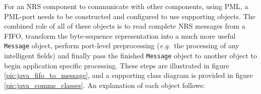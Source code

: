 \documentclass[pdftex,a4paper]{article}
\newif\ifpdf
\newcommand{\eg}{{\em e.g.\ }}
\newcommand{\code}[1]{{\tt \small #1}}
\begin{document}
For an NRS component to communicate with other components, using PML, a
PML-port needs to be constructed and configured to use supporting
objects. The combined role of all of these objects is to read complete
NRS messages from a FIFO, transform the byte-sequence representation
into a much more useful \code{Message} object, perform port-level
preprocessing (\eg the processing of any intelligent fields) and finally
pass the finished \code{Message} object to another object to begin
application specific processing.  These steps are illustrated in figure
\ref{pic:java_fifo_to_message}, and a supporting class diagram is
provided in figure \ref{pic:java_comms_classes}. An explanation of each
object follows:


\ifpdf
\begin{figure}[htb]
  \begin{center}
    \texttt{[image: java\_fifo\_to\_message.pdf]}
    \caption{Object relationships and message flow of objects involved
    in turning PML byte-sequences received from a FIFO into
    \code{Message} objects, which are then used internally. Objects that
    are shared are those which an NRS component using the NRS Java
    Framework will need to create and use. Refer to text for further
    explanation.}
    \label{pic:java_fifo_to_message}
  \end{center}
\end{figure}
\fi
\end{document}
